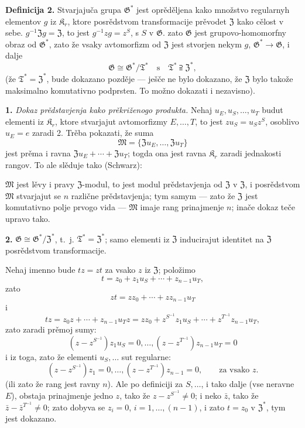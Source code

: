 \documentclass[11pt]{article}
\newcommand{\foreign}[1]{#1}
\begin{document}
\noindent\textbf{Definicija 2.} Stvarjajuča grupa \(\mathfrak G^*\) jest oprěděljena kako množstvo regularnyh elementov \(g\) iz \(\mathfrak K_r\), ktore posrědstvom transformacije prěvodet \(\mathfrak Z\) kako cělost v sebe. \(g^{-1}\mathfrak Zg=\mathfrak Z\), to jest \(g^{-1}zg=z^S\), s \(S\) v \(\mathfrak G\). zato \(\mathfrak G\) jest grupovo-homomorfny obraz od \(\mathfrak G^*\), zato že vsaky avtomorfizm od \(\mathfrak Z\) jest stvorjen nekym \(g\), \(\mathfrak G^*\to\mathfrak G\), i dalje
\[
\mathfrak G\cong\mathfrak G^*/\mathfrak T^*
\quad\text{s}\quad
\mathfrak T^*\supseteqq\mathfrak Z^*,
\]
(že \(\mathfrak T^*=\mathfrak Z^*\), bude dokazano pozděje --- ješče ne bylo dokazano, že \(\mathfrak Z\) bylo takože maksimalno komutativno podprsten. To možno dokazati i nezavisno).

\noindent\textbf{1.} \emph{Dokaz prědstavjenja kako prěkriženogo produkta.} Nehaj \(u_E,u_S,\ldots,u_T\) budut elementi iz \(\mathfrak K_r\), ktore stvarjajut avtomorfizmy \(E,\ldots,T\), to jest \(zu_S=u_Sz^S\), osoblivo \(u_E=e\) zaradi 2. Trěba pokazati, že suma
\[
\mathfrak M=\{\mathfrak Zu_E,\ldots,\mathfrak Zu_T\}
\]
jest prěma i ravna \(\mathfrak Zu_E+\cdots+\mathfrak Zu_T\); togda ona jest ravna \(\mathfrak K_r\) zaradi jednakosti rangov. To ale slěduje tako (\foreign{Schwarz}):

\(\mathfrak M\) jest lěvy i pravy \(\mathfrak Z\)-modul, to jest modul prědstavjenja od \(\mathfrak Z\) v \(\mathfrak Z\), i posrědstvom \(\mathfrak M\) stvarjajut se \(n\) različne prědstavjenja; tym samym --- zato že \(\mathfrak Z\) jest komutativno polje prvogo vida --- \(\mathfrak M\) imaje rang prinajmenje \(n\); inače dokaz teče upravo tako.

\noindent\textbf{2.} \(\mathfrak G\cong\mathfrak G^*/\mathfrak Z^*\), t.~j. \(\mathfrak T^*=\mathfrak Z^*\); samo elementi iz \(\mathfrak Z\) inducirajut identitet na \(\mathfrak Z\) posrědstvom transformacije.

Nehaj imenno bude \(tz=zt\) za vsako \(z\) iz \(\mathfrak Z\); položimo
\[
t=z_0+z_1u_S+\cdots+z_{n-1}u_T,
\]
zato
\[
zt=zz_0+\cdots+zz_{n-1}u_T
\]
i
\[
tz=z_0z+\cdots+z_{n-1}u_Tz
=zz_0+z^{S^{-1}}z_1u_S+\cdots+z^{T^{-1}}z_{n-1}u_T,
\]
zato zaradi prěmoj sumy:
\[
(z-z^{S^{-1}})z_1u_S=0,\ldots,
(z-z^{T^{-1}})z_{n-1}u_T=0
\]
i iz toga, zato že elementi \(u_S,\ldots\) sut regularne:
\[
(z-z^{S^{-1}})z_1=0,\ldots,
(z-z^{T^{-1}})z_{n-1}=0,
\qquad\text{za vsako }z.
\]
(ili zato že rang jest ravny \(n\)). Ale po definiciji za \(S,\ldots\), i tako dalje (vse neravne \(E\)), obstaja prinajmenje jedno \(z\), tako že \(z-z^{S^{-1}}\neq0\); i neko \(\bar z\), tako že \(\bar z-\bar z^{T^{-1}}\neq0\); zato dobyva se \(z_i=0\), \(i=1,\ldots,(n-1)\), i zato \(t=z_0\) v \(\mathfrak Z^*\), tym jest dokazano.
\end{document}
